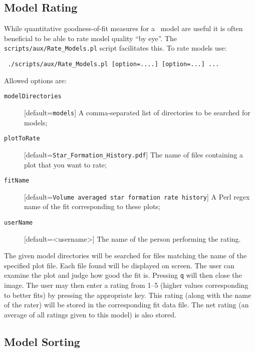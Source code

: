 \subsection{Model Rating}\label{sec:ModelRating}

While quantitative goodness-of-fit measures for a \glc\ model are useful it is often beneficial to be able to rate model quality ``by eye''. The {\tt scripts/aux/Rate\_Models.pl} script facilitates this. To rate models use:
\begin{verbatim}
 ./scripts/aux/Rate_Models.pl [option=....] [option=...] ...
\end{verbatim}
Allowed options are:
\begin{description}
 \item [{\tt modelDirectories}] [default={\tt models}] A comma-separated list of directories to be searched for models;
 \item [{\tt plotToRate}] [default={\tt Star\_Formation\_History.pdf}] The name of files containing a plot that you want to rate;
 \item [{\tt fitName}] [default={\tt Volume averaged star formation rate history}] A Perl regex name of the fit corresponding to these plots;
 \item [{\tt userName}] [default=<username>] The name of the person performing the rating.
\end{description}
The given model directories will be searched for files matching the name of the specified plot file. Each file found will be displayed on screen. The user can examine the plot and judge how good the fit is. Pressing {\tt q} will then close the image. The user may then enter a rating from 1--5 (higher values corresponding to better fits) by pressing the appropriate key. This rating (along with the name of the rater) will be stored in the corresponding fit data file. The net rating (an average of all ratings given to this model) is also stored.

\subsection{Model Sorting}\label{sec:ModelSorting}


